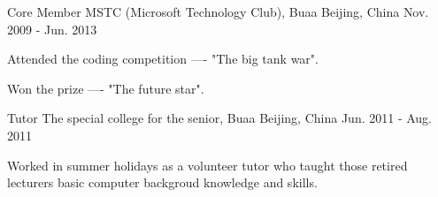 


\begin{cventries}


\cventry
{Core Member} %
{MSTC (Microsoft Technology Club), Buaa} %
{Beijing, China} %
{Nov. 2009 - Jun. 2013} %
{ %
\begin{cvitems}
\item {Attended the coding competition ---- "The big tank war".}
\item {Won the prize ---- "The future star".}
\end{cvitems}
}


\cventry
{Tutor} %
{The special college for the senior, Buaa} %
{Beijing, China} %
{Jun. 2011 - Aug. 2011} %
{ %
\begin{cvitems}
\item {Worked in summer holidays as a volunteer tutor who taught those retired lecturers basic computer backgroud knowledge and skills.}
\end{cvitems}
}


\end{cventries}

